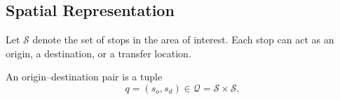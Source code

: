 \subsection{Spatial Representation}

Let $\mathcal{S}$ denote the set of stops in the area of interest. Each stop can act as an origin, a destination, or a transfer location.

\begin{definition}[OD pair]
An origin--destination pair is a tuple
\[
q = (s_o, s_d) \in \mathcal{Q} = \mathcal{S} \times \mathcal{S}.
\]
\end{definition}

